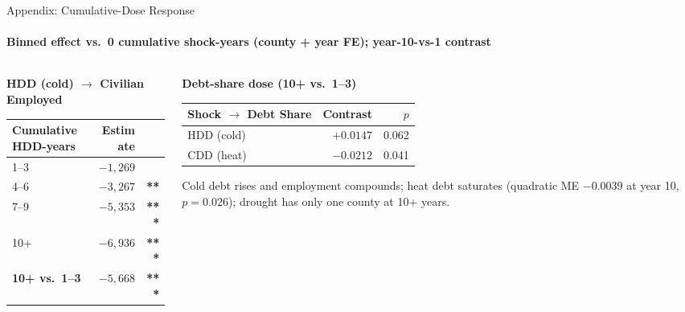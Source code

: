 \documentclass[aspectratio=169,11pt]{beamer}
\newcommand{\emphcolor}[1]{{\color{WarmOrange}\textbf{#1}}}
\newcommand{\tealtext}[1]{{\color{Teal}#1}}
\newcommand{\graytext}[1]{{\color{WarmGray}#1}}
\begin{document}
\begin{frame}[label=appxdose]{Appendix: Cumulative-Dose Response}
  \framesubtitle{Binned effect vs.\ 0 cumulative shock-years (county + year FE); year-10-vs-1 contrast}
  \scriptsize
  \begin{columns}[T]
    \begin{column}{0.50\textwidth}
      \tealtext{\textbf{HDD (cold) $\to$ Civilian Employed}}\\[0.25em]
      \begin{tabular}{@{}lrr@{}}
        \toprule
        Cumulative HDD-years & Estimate & \\
        \midrule
        1--3 & $-1{,}269$ &              \\
        4--6 & $-3{,}267$ & \emphcolor{**}  \\
        7--9 & $-5{,}353$ & \emphcolor{***} \\
        10+  & $-6{,}936$ & \emphcolor{***} \\
        \midrule
        \emphcolor{10+ vs.\ 1--3} & \emphcolor{$-5{,}668$} & \emphcolor{***} \\
        \bottomrule
      \end{tabular}
    \end{column}
    \begin{column}{0.46\textwidth}
      \tealtext{\textbf{Debt-share dose (10+ vs.\ 1--3)}}\\[0.25em]
      \begin{tabular}{@{}lrr@{}}
        \toprule
        Shock $\to$ Debt Share & Contrast & $p$ \\
        \midrule
        HDD (cold) & $+0.0147$ & 0.062 \\
        CDD (heat) & $-0.0212$ & 0.041 \\
        \bottomrule
      \end{tabular}
      \vspace{0.3em}
      \graytext{\scriptsize Cold debt rises and employment compounds; heat debt saturates (quadratic ME $-0.0039$ at year 10, $p{=}0.026$); drought has only one county at 10+ years.}
    \end{column}
  \end{columns}
  \vspace{0.3em}\hfill\hyperlink{p2res}{}
\end{frame}
\end{document}
